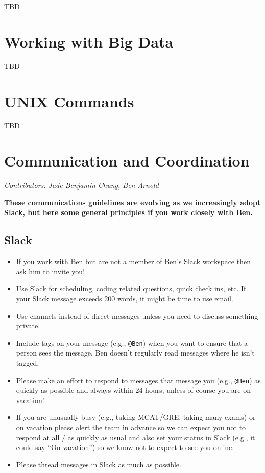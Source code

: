 \documentclass[]{book}
\begin{document}
TBD

\hypertarget{bigdata}{%
\chapter{Working with Big Data}\label{bigdata}}

TBD

\hypertarget{unix}{%
\chapter{UNIX Commands}\label{unix}}

TBD

\hypertarget{commcoord}{%
\chapter{Communication and Coordination}\label{commcoord}}

\emph{Contributors: Jade Benjamin-Chung, Ben Arnold}

\textbf{These communications guidelines are evolving as we increasingly adopt Slack, but here some general principles if you work closely with Ben.}

\hypertarget{slack}{%
\section{Slack}\label{slack}}

\begin{itemize}
\item
  If you work with Ben but are not a member of Ben's Slack workspace then ask him to invite you!
\item
  Use Slack for scheduling, coding related questions, quick check ins, etc. If your Slack message exceeds 200 words, it might be time to use email.
\item
  Use channels instead of direct messages unless you need to discuss something private.
\item
  Include tags on your message (e.g., \texttt{@Ben}) when you want to ensure that a person sees the message. Ben doesn't regularly read messages where he isn't tagged.
\item
  Please make an effort to respond to messages that message you (e.g., \texttt{@Ben}) as quickly as possible and always within 24 hours, unless of course you are on vacation!
\item
  If you are unusually busy (e.g., taking MCAT/GRE, taking many exams) or on vacation please alert the team in advance so we can expect you not to respond at all / as quickly as usual and also \href{https://get.slack.help/hc/en-us/articles/201864558-Set-your-Slack-status-and-availability}{set your status in Slack} (e.g., it could say ``On vacation'') so we know not to expect to see you online.
\item
  Please thread messages in Slack as much as possible.
\end{itemize}
\end{document}
